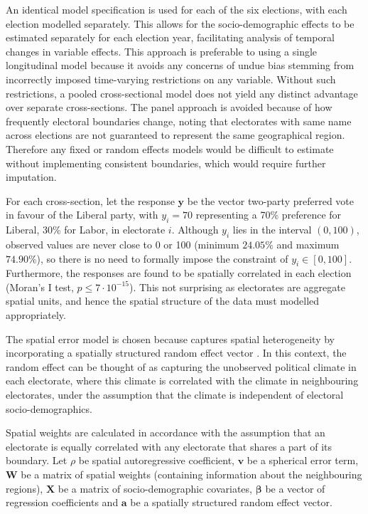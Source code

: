 \documentclass[11pt,a4paper,]{article}
\begin{document}
An identical model specification is used for each of the six elections, with each election modelled separately. This allows for the socio-demographic effects to be estimated separately for each election year, facilitating analysis of temporal changes in variable effects. This approach is preferable to using a single longitudinal model because it avoids any concerns of undue bias stemming from incorrectly imposed time-varying restrictions on any variable. Without such restrictions, a pooled cross-sectional model does not yield any distinct advantage over separate cross-sections. The panel approach is avoided because of how frequently electoral boundaries change, noting that electorates with same name across elections are not guaranteed to represent the same geographical region. Therefore any fixed or random effects models would be difficult to estimate without implementing consistent boundaries, which would require further imputation.

For each cross-section, let the response \(\boldsymbol y\) be the vector two-party preferred vote in favour of the Liberal party, with \(y_i = 70\) representing a 70\% preference for Liberal, 30\% for Labor, in electorate \(i\). Although \(y_i\) lies in the interval \((0,100)\), observed values are never close to 0 or 100 (minimum \(24.05 \%\) and maximum \(74.90 \%\)), so there is no need to formally impose the constraint of \(y_i \in [0,100]\). Furthermore, the responses are found to be spatially correlated in each election (Moran's I test, \(p \le 7\cdot10^{-15}\)). This not surprising as electorates are aggregate spatial units, and hence the spatial structure of the data must modelled appropriately.

The spatial error model \autocite{Anselin88} is chosen because captures spatial heterogeneity by incorporating a spatially structured random effect vector \autocite{LeSage2009}. In this context, the random effect can be thought of as capturing the unobserved political climate in each electorate, where this climate is correlated with the climate in neighbouring electorates, under the assumption that the climate is independent of electoral socio-demographics.

Spatial weights are calculated in accordance with the assumption that an electorate is equally correlated with any electorate that shares a part of its boundary. Let \(\rho\) be spatial autoregressive coefficient, \(\boldsymbol v\) be a spherical error term, \({\boldsymbol W}\) be a matrix of spatial weights (containing information about the neighbouring regions), \(\boldsymbol X\) be a matrix of socio-demographic covariates, \(\boldsymbol \beta\) be a vector of regression coefficients and \(\boldsymbol a\) be a spatially structured random effect vector.
\end{document}
